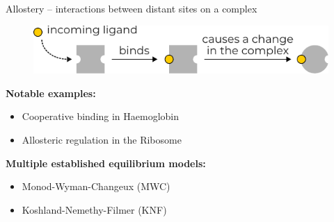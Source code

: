 \documentclass[10pt,mathserif]{beamer}
\begin{document}
\begin{frame}[fragile]{Allostery -- interactions between distant sites on a complex}
	\newrefsection
	\begin{figure}
		\centering
		\includegraphics{figures/allostery_diagram.pdf}
	\end{figure}


	\textbf{Notable examples:}
	\vspace{-.7em}
	\begin{itemize}
		\setlength\itemsep{0em}
		\item Cooperative binding in Haemoglobin \cite{stefanCooperativeBinding2013}
		\item Allosteric regulation in the Ribosome \cite{makarovaRibosomeAllostericallyRegulated2017}
	\end{itemize}

	\textbf{Multiple established equilibrium models:}
	\vspace{-.7em}
	\begin{itemize}
		\setlength\itemsep{0em}
		\item Monod-Wyman-Changeux (MWC)\cite{monodNatureAllostericTransitions1965}
		\item Koshland-Nemethy-Filmer (KNF)\cite{koshlandComparisonExperimentalBinding1966}
	\end{itemize}

	\vfill
	\printbibliography[heading=none]
	\vspace{-\fill}
\end{frame}
\end{document}
